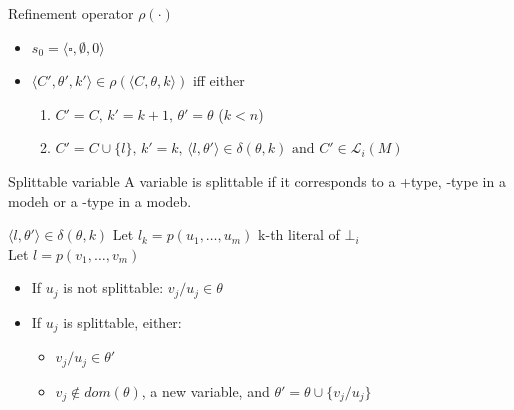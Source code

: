 \begin{frame}{Refinement operator $\rho(\cdot)$}


\begin{itemize}
    \item $s_0 = \langle\square, \emptyset, 0\rangle$
    \item $\langle C', \theta', k'\rangle \in \rho(\langle C, \theta, k\rangle)$ iff either
    \begin{enumerate}
        \item $C'=C, \, k'=k+1, \, \theta' = \theta$ ($k<n$)
        \item $C'=C\cup\{l\}, \, k'=k, \, \langle l, \theta'\rangle \in \delta(\theta, k) \text{ and } C'\in \mathcal{L}_i(M) $
    \end{enumerate}

\end{itemize}

\begin{block}{Splittable variable}
A variable is splittable if it corresponds to a +type, -type in a modeh or a -type in a modeb.
\end{block}

\begin{block}{$\langle l, \theta'\rangle \in \delta(\theta, k)$}
Let $l_k = p(u_1, \dots, u_m)$ \hfill k-th literal of $\bot_i$ \\
Let $l = p(v_1, \dots, v_m)$ \\
\begin{itemize}
    \item If $u_j$ is not splittable: $v_j/u_j \in \theta$
    \item If $u_j$ is splittable, either:
    \begin{itemize}
        \item $v_j/u_j \in \theta'$
        \item $v_j \notin dom(\theta)$, a new variable, and $\theta' = \theta\cup\{v_j/u_j\}$
    \end{itemize}
\end{itemize}

\end{block}
    
\end{frame}